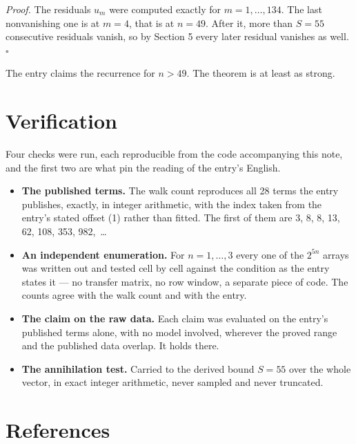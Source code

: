 \documentclass[11pt]{article}
\theoremstyle{definition}
\begin{document}
{\itshape Proof.} The residuals $u_m$ were computed exactly for $m = 1,\dots,134$. The last nonvanishing one is at $m = 4$, that is at $n = 49$. After it, more than $S = 55$ consecutive residuals vanish, so by Section 5 every later residual vanishes as well. $\square$

The entry claims the recurrence for $n > 49$. The theorem is at least as strong.

\section{Verification}

Four checks were run, each reproducible from the code accompanying this note, and the first two are what pin the reading of the entry's English.

\begin{itemize}

\item {\bfseries The published terms.} The walk count reproduces all 28 terms the entry publishes, exactly, in integer arithmetic, with the index taken from the entry's stated offset (1) rather than fitted. The first of them are 3, 8, 8, 13, 62, 108, 353, 982,~\dots

\item {\bfseries An independent enumeration.} For $n = 1,\dots,3$ every one of the $2^{5n}$ arrays was written out and tested cell by cell against the condition as the entry states it --- no transfer matrix, no row window, a separate piece of code. The counts agree with the walk count and with the entry.

\item {\bfseries The claim on the raw data.} Each claim was evaluated on the entry's published terms alone, with no model involved, wherever the proved range and the published data overlap. It holds there.

\item {\bfseries The annihilation test.} Carried to the derived bound $S = 55$ over the whole vector, in exact integer arithmetic, never sampled and never truncated.

\end{itemize}

\section{References}
\end{document}
